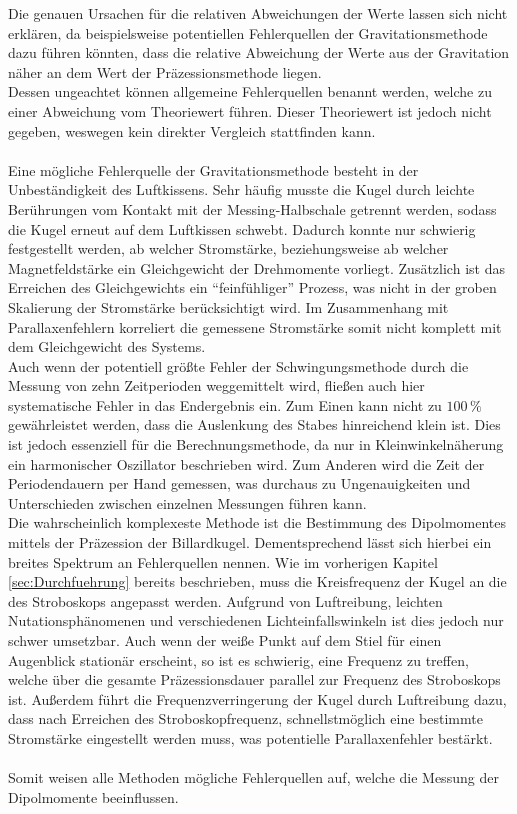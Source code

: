 \noindent Die genauen Ursachen für die relativen Abweichungen der Werte lassen sich nicht erklären, da beispielsweise 
potentiellen Fehlerquellen der Gravitationsmethode dazu führen könnten, dass die relative Abweichung der Werte aus der 
Gravitation näher an dem Wert der Präzessionsmethode liegen. \\
Dessen ungeachtet können allgemeine Fehlerquellen benannt werden, welche zu einer Abweichung vom Theoriewert führen. Dieser 
Theoriewert ist jedoch nicht gegeben, weswegen kein direkter Vergleich stattfinden kann.\\\\
Eine mögliche Fehlerquelle der Gravitationsmethode besteht in der Unbeständigkeit des Luftkissens. Sehr häufig musste 
die Kugel durch leichte Berührungen vom Kontakt mit der Messing-Halbschale getrennt werden, sodass die Kugel erneut 
auf dem Luftkissen schwebt. Dadurch konnte nur schwierig festgestellt werden, ab welcher Stromstärke, beziehungsweise ab 
welcher Magnetfeldstärke ein Gleichgewicht der Drehmomente vorliegt. Zusätzlich ist das Erreichen des Gleichgewichts 
ein \enquote{feinfühliger} Prozess, was nicht in der groben Skalierung der Stromstärke berücksichtigt wird. Im Zusammenhang 
mit Parallaxenfehlern korreliert die gemessene Stromstärke somit nicht komplett mit dem Gleichgewicht des Systems.\\
Auch wenn der potentiell größte Fehler der Schwingungsmethode durch die Messung von zehn Zeitperioden weggemittelt wird,
fließen auch hier systematische Fehler in das Endergebnis ein. Zum Einen kann nicht zu $100\,\unit{\percent}$ 
gewährleistet werden, dass die Auslenkung des Stabes hinreichend klein ist. Dies ist jedoch essenziell für die 
Berechnungsmethode, da nur in Kleinwinkelnäherung ein harmonischer Oszillator beschrieben wird. Zum Anderen wird die Zeit 
der Periodendauern per Hand gemessen, was durchaus zu Ungenauigkeiten und Unterschieden zwischen einzelnen Messungen 
führen kann. \\
Die wahrscheinlich komplexeste Methode ist die Bestimmung des Dipolmomentes mittels der Präzession der Billardkugel.
Dementsprechend lässt sich hierbei ein breites Spektrum an Fehlerquellen nennen. Wie im vorherigen Kapitel \ref{sec:Durchfuehrung}
bereits beschrieben, muss die Kreisfrequenz der Kugel an die des Stroboskops angepasst werden. Aufgrund von Luftreibung,
leichten Nutationsphänomenen und verschiedenen Lichteinfallswinkeln ist dies jedoch nur schwer umsetzbar. Auch wenn der weiße
Punkt auf dem Stiel für einen Augenblick stationär erscheint, so ist es schwierig, eine Frequenz zu treffen, welche über 
die gesamte Präzessionsdauer parallel zur Frequenz des Stroboskops ist. Außerdem führt die Frequenzverringerung der Kugel 
durch Luftreibung dazu, dass nach Erreichen des Stroboskopfrequenz, schnellstmöglich eine bestimmte Stromstärke eingestellt werden 
muss, was potentielle Parallaxenfehler bestärkt. \\\\
Somit weisen alle Methoden mögliche Fehlerquellen auf, welche die Messung der Dipolmomente beeinflussen.

